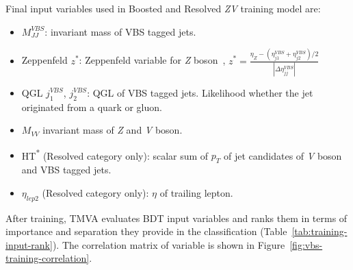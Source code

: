 Final input variables used in Boosted and Resolved \textit{ZV} training model are:
\begin{itemize}
  \item \( M_{JJ}^{VBS} \): invariant mass of \gls{VBS} tagged jets.
  \item Zeppenfeld \( z^{*} \): Zeppenfeld variable for \textit{Z} boson~\cite{Rainwater1996}, \( z^{*} = \frac{\eta_{Z} - (\eta_{j1}^{VBS} + \eta_{j2}^{VBS})/2}{|\Delta \eta_{jj}^{VBS}|} \)
  \item QGL \( j_{1}^{VBS} \), \( j_{2}^{VBS} \): \gls{QGL} of VBS tagged jets. Likelihood whether the jet originated from a quark or gluon.
  \item \( M_{VV} \) invariant mass of \textit{Z} and \textit{V} boson.
  \item HT\textsuperscript{*} (Resolved category only): scalar sum of \(p_T\) of jet candidates
        of \textit{V} boson and \gls{VBS} tagged jets.
  \item \( \eta_{lep2} \) (Resolved category only): \( \eta \) of trailing lepton.
\end{itemize}

After training, \gls{TMVA} evaluates \gls{BDT} input variables
and ranks them in terms of importance and separation
they provide in the classification (Table~\ref{tab:training-input-rank}).
The correlation matrix of variable is shown in Figure~\ref{fig:vbs-training-correlation}.

